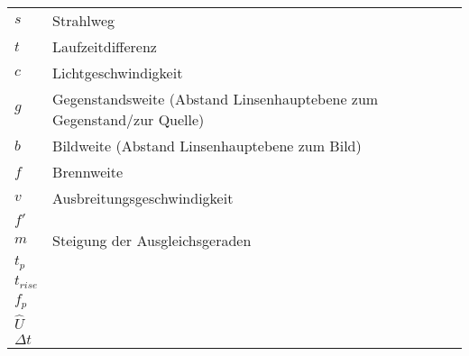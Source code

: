 \begin{table}[h]
    \begin{tabular}{@{}ll@{}}
        $s$ & Strahlweg\\
        $t$ & Laufzeitdifferenz\\
        $c$ & Lichtgeschwindigkeit\\
        $g$ & Gegenstandsweite (Abstand Linsenhauptebene zum Gegenstand/zur Quelle)\\
        $b$ & Bildweite (Abstand Linsenhauptebene zum Bild)\\
        $f$ & Brennweite\\
        $v$ & Ausbreitungsgeschwindigkeit\\
        $f'$ & \\
        $m$ & Steigung der Ausgleichsgeraden\\
        $t_p$ & \\
        $t_{rise}$ & \\
        $f_p$ & \\
        $\hat{U}$ & \\
        $\Delta t$ & \\        
    \end{tabular}
    \label{tab:glossar}
\end{table}